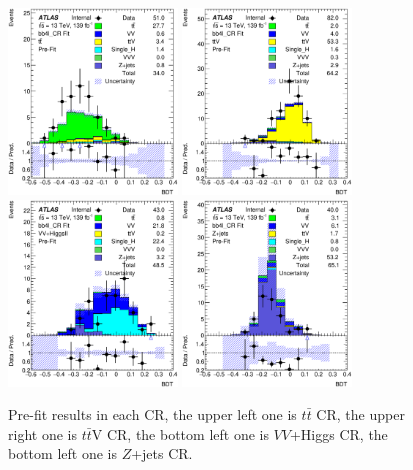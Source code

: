 \begin{figure}[H]
	\caption{Pre-fit results in each CR, the upper left one is $t\bar{t}$ CR, the upper right one is $t\bar{t}$V CR, the bottom left one is $VV$+Higgs CR, the bottom left one is $Z$+jets CR.}
	\label{Fig.CRs pre-fit}
	\centering
	\includegraphics[width=0.4\textwidth]{figures/4lbb/Plots/tt_CR.eps}
	\includegraphics[width=0.4\textwidth]{figures/4lbb/Plots/ttV_CR.eps}
	\includegraphics[width=0.4\textwidth]{figures/4lbb/Plots/VVHiggsII_CR.eps}
	\includegraphics[width=0.4\textwidth]{figures/4lbb/Plots/Zjets_CR.eps}
\end{figure}

